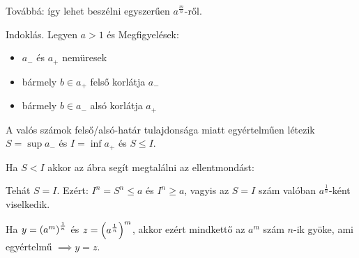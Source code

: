 Továbbá:
így lehet beszélni egyszerűen $a^{\frac{m}{n}}$-ről.

\vspace{1cm} Indoklás. 
Legyen $a>1$ és
Megfigyelések:
\begin{itemize}
   \item $a_{-}$ és $a_{+}$ nemüresek
   \item bármely $b\in a_{+}$ felső korlátja $a_{-}$
   \item bármely $b\in a_{-}$ alsó korlátja $a_{+}$
\end{itemize}
A valós számok felső/alsó-határ tulajdonsága miatt egyértelműen létezik
$S=\sup a_{-}$ és $I=\inf a_{+}$ és $S\le I.$
\Dnew{}

Ha $S < I$ akkor az ábra segít megtalálni az ellentmondást:
\begin{center}
\end{center}
Tehát $S=I.$ Ezért: $I^n = S^n \le a$ és $I^n\ge a$, vagyis az $S=I$ szám
valóban $a^{\frac{1}{n}}$-ként viselkedik.

Ha $y={ \left( a^m \right) }^\frac{1}{n}$ és $z={ \left( a^\frac{1}{n} \right) }^{m}$, akkor
ezért mindkettő az $a^m$ szám $n$-ik gyöke, ami egyértelmű $\implies y=z.$
